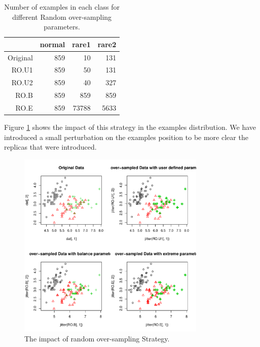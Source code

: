 \documentclass[10pt,a4paper]{article}\usepackage[]{graphicx}\usepackage[]{color}
\newenvironment{knitrout}{}{} %
\begin{document}
\begin{table}[ht]
\centering
\begin{tabular}{rrrr}
  \hline
 & normal & rare1 & rare2 \\ 
  \hline
Original & 859 &  10 & 131 \\ 
  RO.U1 & 859 &  50 & 131 \\ 
  RO.U2 & 859 &  40 & 327 \\ 
  RO.B & 859 & 859 & 859 \\ 
  RO.E & 859 & 73788 & 5633 \\ 
   \hline
\end{tabular}
\caption{Number of examples in each class for different Random over-sampling parameters.} 
\label{tab:RO_tab}
\end{table}


Figure \ref{fig:IrisRO} shows the impact of this strategy in the examples distribution. We have introduced a small perturbation on the examples position to be more clear the replicas that were introduced.

\begin{knitrout}\footnotesize
{}\color{fgcolor}\begin{figure}

{\centering \includegraphics[width=0.8\textwidth]{figures/UBL-IrisRO-1} 

}

\caption[The impact of random over-sampling Strategy]{The impact of random over-sampling Strategy.}\label{fig:IrisRO}
\end{figure}


\end{knitrout}
\end{document}

